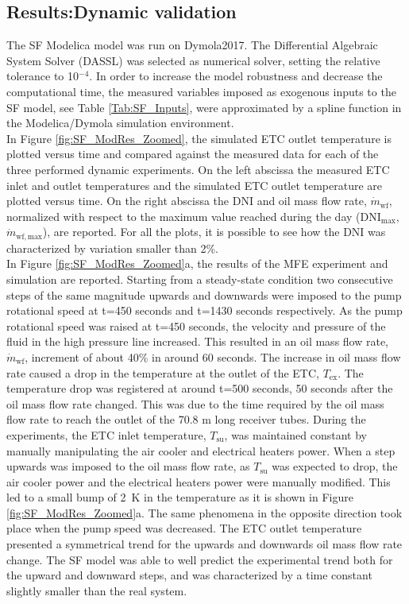 \documentclass[final,3p,times,review]{elsarticle}
\begin{document}
\subsection{Results:Dynamic validation}  \label{Sec:DynamicValidation}
%
The SF Modelica model was run on Dymola2017. The Differential Algebraic System Solver (DASSL) \cite{Petzold1983} was selected as numerical solver, setting the relative tolerance to 10$^{-4}$. In order to increase the model robustness and decrease the computational time, the measured variables imposed as exogenous inputs to the SF model, see Table \ref{Tab:SF_Inputs}, were approximated by a spline function in the Modelica/Dymola simulation environment.\\
In Figure \ref{fig:SF_ModRes_Zoomed}, the simulated ETC outlet temperature is plotted versus time and compared against the measured data for each of the three performed dynamic experiments. On the left abscissa the measured ETC inlet and outlet temperatures and the simulated ETC outlet temperature are plotted versus time. On the right abscissa the DNI and oil mass flow rate, $\dot{m}_\mathrm{wf}$, normalized with respect to the maximum value reached during the day (DNI$_\mathrm{max}$, $\dot{m}_\mathrm{wf,max}$), are reported.  For all the plots, it is possible to see how the DNI was characterized by variation smaller than 2\%. \\

In Figure \ref{fig:SF_ModRes_Zoomed}a, the results of the MFE experiment and simulation are reported. Starting from a steady-state condition two consecutive steps of the same magnitude upwards and downwards were imposed to the pump rotational speed at t=450 seconds and t=1430 seconds respectively. As the pump rotational speed was raised at t=450 seconds, the velocity and pressure of the fluid in the high pressure line increased. This resulted in an oil mass flow rate, $\dot{m}_\mathrm{wf}$, increment of about 40\% in around 60 seconds. The increase in oil mass flow rate caused a drop in the temperature at the outlet of the ETC, $T_\mathrm{ex}$. The temperature drop was registered at around t=500 seconds, 50 seconds after the oil mass flow rate changed. This was due to the time required by the oil mass flow rate to reach the outlet of the 70.8 m long receiver tubes. During the experiments, the ETC inlet temperature, $T_\mathrm{su}$, was maintained constant  by manually manipulating the air cooler and electrical heaters power. 
When a step upwards was imposed to the oil mass flow rate, as $T_\mathrm{su}$ was expected to drop, the air cooler power  and the electrical heaters power were manually modified. This led to a small bump of 2~K in the temperature as it is shown in Figure \ref{fig:SF_ModRes_Zoomed}a.  
The same phenomena in the opposite direction took place when the pump speed was decreased. 
The ETC outlet temperature presented a symmetrical trend for the upwards and downwards oil mass flow rate change. The SF model was able to well predict the experimental trend both for the upward and downward steps, and was characterized by a time constant slightly smaller than the real system.\\
\end{document}
